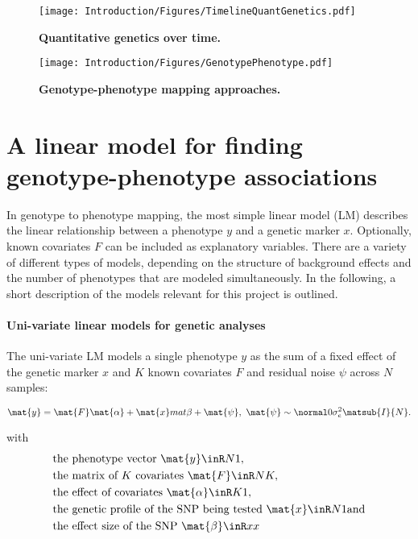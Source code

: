 \begin{figure}[hbtp]
	\centering
	\texttt{[image: Introduction/Figures/TimelineQuantGenetics.pdf]}
	\caption[\textbf{Quantitative genetics over time. }]{\textbf{Quantitative genetics over time. }} 
	 	\label{fig:timeline-genetics}
\end{figure}

\begin{figure}[hbtp]
	\centering
	\texttt{[image: Introduction/Figures/GenotypePhenotype.pdf]}
	\caption[\textbf{Genotype-phenotype mapping approaches. }]{\textbf{Genotype-phenotype mapping approaches. }} 
	 	\label{fig:genotype-phenotype}
\end{figure}



\section{A linear model for finding genotype-phenotype associations}

In genotype to phenotype mapping, the most simple linear model (LM) describes the linear relationship between a phenotype \(y\) and a genetic marker \(x\). Optionally, known covariates \(F\) can be included as explanatory variables. There are a variety of different types of models, depending on the structure of background effects and the number of phenotypes that are modeled simultaneously. In the following, a short description of the models relevant for this project is outlined. 

\label{sec:ssection:lm}
\paragraph{Uni-variate linear models for genetic analyses}
The uni-variate LM models a single phenotype \(y\) as the sum of a fixed effect of the genetic marker \(x\) and \(K\) known covariates \(F\) and residual noise \(\psi\) across \(N\) samples:

\begin{equation}
\mat{y} = \mat{F}\mat{\alpha} + \mat{x}mat{\beta} + \mat{\psi},\text{ }
\mat{\psi} \sim \normal 0 {\sigma_e^2\matsub{I}{N}}.
\label{eq:lm-uv}
\end{equation}

with
\begin{align*} 
& \text{the phenotype vector } \mat{y} \inR N 1,\\
& \text{the matrix of $K$ covariates }\mat{F} \inR N K,\\
& \text{the effect of covariates } \mat{\alpha} \inR K 1,\\
& \text{the genetic profile of the SNP being tested }\mat{x} \inR N 1 \text{and}\\
& \text{the effect size of the SNP } \mat{\beta} \inR x x \\
\end{align*} 


